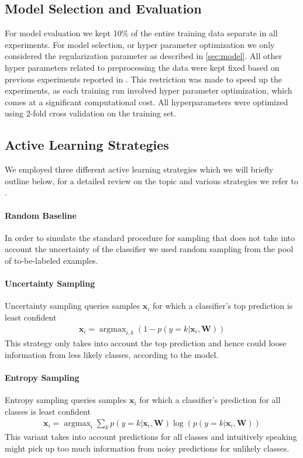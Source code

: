 \documentclass[runningheads,a4paper]{article}
\renewcommand{\vec}[1]{\mathbf{#1}}
\DeclareMathOperator*{\argmax}{argmax}
\begin{document}
\subsection{Model Selection and Evaluation}\label{sec:crossvalidation}
For model evaluation we kept 10\% of the entire training data separate in all experiments. For model selection, or hyper parameter optimization we only considered the regularization parameter as described in \autoref{sec:model}. All other hyper parameters related to preprocessing the data were kept fixed based on previous experiments reported in \cite{Biessmann16}. This restriction was made to speed up the experiments, as each training run involved hyper parameter optimization, which comes at a significant computational cost. All hyperparameters were optimized using 2-fold cross validation on the training set. 

\subsection{Active Learning Strategies}\label{sec:active_learning_strategies}
We employed three different active learning strategies which we will briefly outline below, for a detailed review on the topic and various strategies we refer to \cite{2012Settles}. 

\paragraph{Random Baseline} In order to simulate the standard procedure for sampling that does not take into account the uncertainty of the classifier we used random sampling from the pool of to-be-labeled examples. 

\paragraph{Uncertainty Sampling}
Uncertainty sampling queries samples $\vec{x}_i$ for which a classifier's top prediction is least confident
\begin{align}\label{eq:uncertainty_sampling}
\vec{x}_i = \argmax_{i,k} \left(1- p(y=k|\vec{x}_i,\vec{W})\right)
\end{align}
This strategy only takes into account the top prediction and hence could loose information from less likely classes, according to the model. 

\paragraph{Entropy Sampling}
Entropy sampling queries samples $\vec{x}_i$ for which a classifier's prediction for all classes is least confident
\begin{align}\label{eq:entropy_sampling}
\vec{x}_i = \argmax_{i} \sum_k p(y=k|\vec{x}_i,\vec{W}) \log(p(y=k|\vec{x}_i,\vec{W}))
\end{align}
This variant takes into account predictions for all classes and intuitively speaking might pick up too much information from noisy predictions for unlikely classes. 
\end{document}
